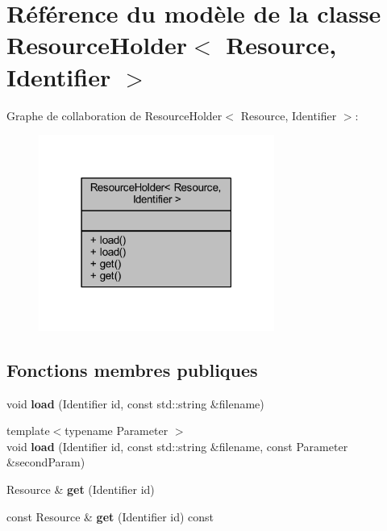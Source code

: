 \hypertarget{class_resource_holder}{}\section{Référence du modèle de la classe Resource\+Holder$<$ Resource, Identifier $>$}
\label{class_resource_holder}


Graphe de collaboration de Resource\+Holder$<$ Resource, Identifier $>$\+:\nopagebreak
\begin{figure}[H]
\begin{center}
\leavevmode
\includegraphics[width=219pt]{class_resource_holder__coll__graph}
\end{center}
\end{figure}
\subsection*{Fonctions membres publiques}
\begin{DoxyCompactItemize}
\item 
\hypertarget{class_resource_holder_accb6a2b6bd2da503ddfd57b5c0028a16}{}\label{class_resource_holder_accb6a2b6bd2da503ddfd57b5c0028a16} 
void {\bfseries load} (Identifier id, const std\+::string \&filename)
\item 
\hypertarget{class_resource_holder_ae83a7a88b2b2a74b6143796eb4452110}{}\label{class_resource_holder_ae83a7a88b2b2a74b6143796eb4452110} 
{\footnotesize template$<$typename Parameter $>$ }\\void {\bfseries load} (Identifier id, const std\+::string \&filename, const Parameter \&second\+Param)
\item 
\hypertarget{class_resource_holder_a6452638a75b6df7ea7d610f204632850}{}\label{class_resource_holder_a6452638a75b6df7ea7d610f204632850} 
Resource \& {\bfseries get} (Identifier id)
\item 
\hypertarget{class_resource_holder_aaf453199dbdfb9b8395c52b29eb915c2}{}\label{class_resource_holder_aaf453199dbdfb9b8395c52b29eb915c2} 
const Resource \& {\bfseries get} (Identifier id) const
\end{DoxyCompactItemize}


